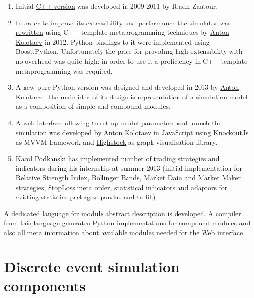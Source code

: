 \documentclass[a4paper,11pt]{article}
\begin{document}
\begin{enumerate}
\def\labelenumi{\arabic{enumi}.}
\itemsep1pt\parskip0pt
\item
  Initial
  \href{http://sourceforge.net/p/marketsimulator/svn/HEAD/tree/Simulator/}{C++
  version} was developed in 2009-2011 by Riadh Zaatour.
\item
  In order to improve its extensibility and performance the simulator
  was \href{https://github.com/antonkolotaev/v2}{rewritten} using C++
  template metaprogramming techniques by
  \href{https://github.com/antonkolotaev}{Anton Kolotaev} in 2012.
  Python bindings to it were implemented using Boost.Python.
  Unfortunately the price for providing high extensibility with no
  overhead was quite high: in order to use it a proficiency in C++
  template metaprogramming was required.
\item
  A new pure Python version was designed and developed in 2013 by
  \href{https://github.com/antonkolotaev}{Anton Kolotaev}. The main idea
  of its design is representation of a simulation model as a composition
  of simple and compound modules. 
\item
  A web interface allowing to set up model parameters and launch the
  simulation was developed by
  \href{https://github.com/antonkolotaev}{Anton Kolotaev} in JavaScript
  using \href{http://knockoutjs.com/}{KnockoutJs} as MVVM framework and
  \href{http://www.highcharts.com/products/highstock}{Highstock} as
  graph visualisation library.
\item
  \href{https://github.com/koalainparis}{Karol Podkanski} has
  implemented number of trading strategies and indicators during his
  internship at summer 2013 (initial implementation for Relative
  Strength Index, Bollinger Bands, Market Data and Market Maker
  strategies, StopLoss meta order, statistical indicators and adaptors
  for existing statistics packages:
  \href{http://pandas.pydata.org/}{pandas} and
  \href{http://ta-lib.org/}{ta-lib})
\end{enumerate}

A dedicated language for module abstract description is developed.
A compiler from this language generates Python implementations for
compound modules and also all meta information about available modules
needed for the Web interface. 

\section{Discrete event simulation
components}\label{discrete-event-simulation-components}
\end{document}
